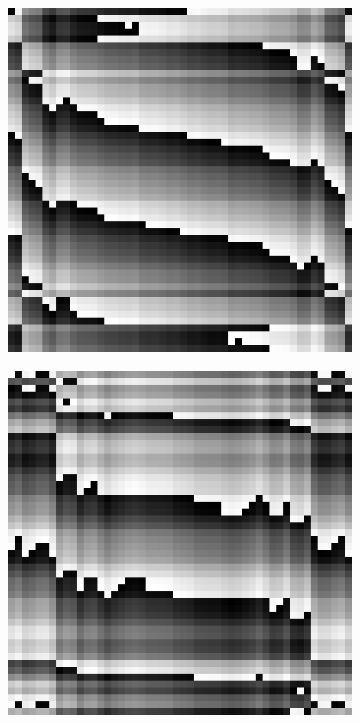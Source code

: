 \begin{figure}[htpb]
\begin{subfigure}{.25\textwidth}
\end{subfigure}%
\begin{subfigure}{.25\textwidth}
\includegraphics[width=1\textwidth]{img/PhaseDifferenceRank1Sigma150}
\end{subfigure}%
\begin{subfigure}{.25\textwidth}
\includegraphics[width=1\textwidth]{img/PhaseDifferenceRank1Sigma300}

\end{subfigure}
\end{figure}
